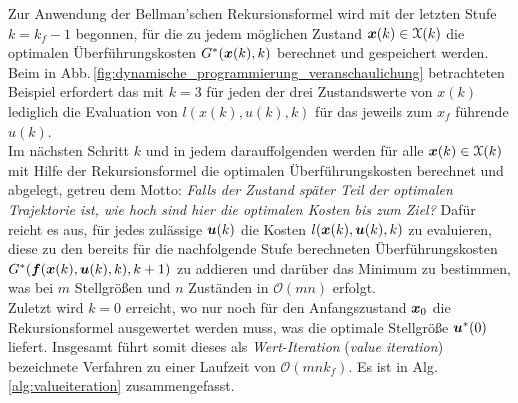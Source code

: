 Zur Anwendung der Bellman'schen Rekursionsformel wird mit der letzten Stufe $k = k_f-1$ begonnen, für die zu jedem möglichen Zustand $\boldsymbol{x}(k) \in \mathcal X(k)$ die optimalen Überführungskosten $G^\ast(\boldsymbol{x}(k),k)$ berechnet und gespeichert werden. Beim in Abb.\,\ref{fig:dynamische_programmierung_veranschaulichung} betrachteten Beispiel erfordert das mit $k=3$ für jeden der drei Zustandswerte von $x(k)$ lediglich die Evaluation von $l(x(k), u(k), k)$ für das jeweils zum $x_f$ führende $u(k)$. \\
Im nächsten Schritt $k$ und in jedem darauffolgenden werden für alle $\boldsymbol{x}(k) \in \mathcal X(k)$ mit Hilfe der Rekursionsformel die optimalen Überführungskosten berechnet und abgelegt, getreu dem Motto: \emph{Falls der Zustand später Teil der optimalen Trajektorie ist, wie hoch sind hier die optimalen Kosten bis zum Ziel?} Dafür reicht es aus, für jedes zulässige $\boldsymbol{u}(k)$ die Kosten $l(\boldsymbol{x}(k), \boldsymbol{u}(k), k)$ zu evaluieren, diese zu den bereits für die nachfolgende Stufe berechneten Überführungskosten $G^\ast(\boldsymbol{f}(\boldsymbol{x}(k), \boldsymbol{u}(k),k),k+1)$ zu addieren und darüber das Minimum zu bestimmen, was bei $m$ Stellgrößen und $n$ Zuständen in $\mathcal O(m n)$ erfolgt. \\
Zuletzt wird $k=0$ erreicht, wo nur noch für den Anfangszustand $\boldsymbol{x}_0$ die Rekursionsformel ausgewertet werden muss, was die optimale Stellgröße $\boldsymbol{u}^\ast(0)$ liefert. Insgesamt führt somit dieses als \emph{Wert-Iteration} (\emph{value iteration}) bezeichnete Verfahren zu  einer Laufzeit von $\mathcal O(m n k_f)$. Es ist in Alg.\,\ref{alg:valueiteration} zusammengefasst.

